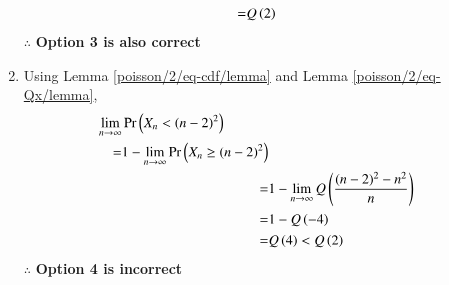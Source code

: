 \begin{enumerate}
\begin{align}
    \\=& Q\left(2\right)
\end{align}
$\mathbf{\therefore}$ \textbf{Option 3 is also correct}
\item Using Lemma         \ref{poisson/2/eq-cdf/lemma} and Lemma \ref{poisson/2/eq-Qx/lemma},
\begin{align}
   \begin{split}
    \lim \limits_{n \to \infty} & \Pr\left(X_n < (n-2)^2\right)\\ =&1-\lim \limits_{n \to \infty}  \Pr\left(X_n \geq (n-2)^2\right)
\end{split}
    \\=&1-\lim \limits_{n \to \infty}Q \left(\frac{(n-2)^2-n^2}{n}\right)
    \\=&1- Q \left(-4\right)
    \\=& Q\left(4\right) < Q \left(2\right)
\end{align}
$\mathbf{\therefore}$ \textbf{Option 4 is incorrect}
\end{enumerate}
